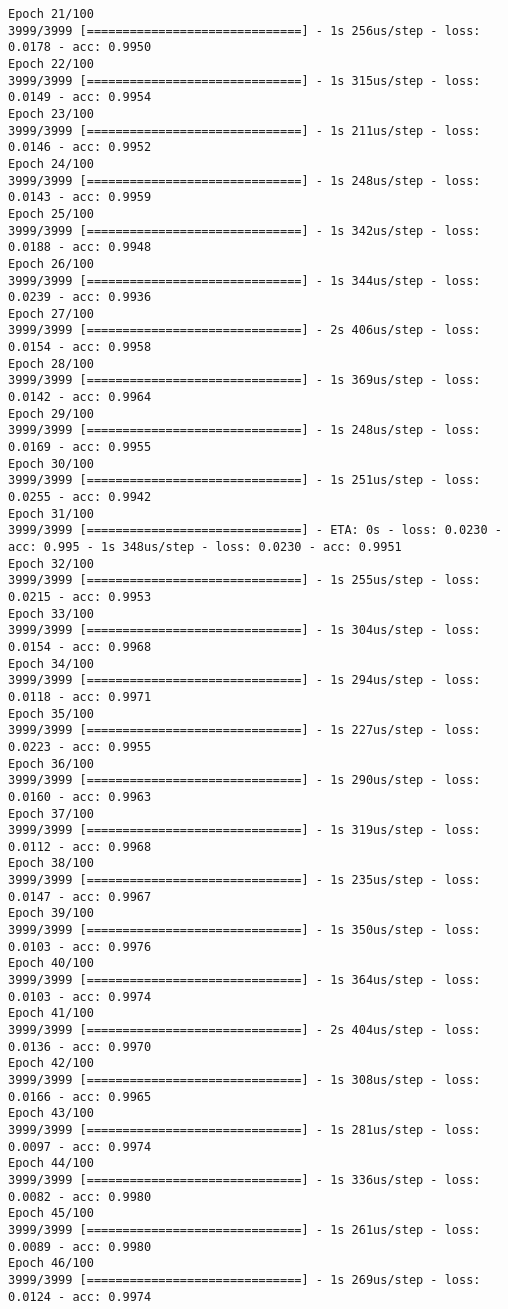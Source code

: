 \documentclass[11pt]{article}
\begin{document}
\begin{Verbatim}[commandchars=\\\{\}]
Epoch 21/100
3999/3999 [==============================] - 1s 256us/step - loss: 0.0178 - acc: 0.9950
Epoch 22/100
3999/3999 [==============================] - 1s 315us/step - loss: 0.0149 - acc: 0.9954
Epoch 23/100
3999/3999 [==============================] - 1s 211us/step - loss: 0.0146 - acc: 0.9952
Epoch 24/100
3999/3999 [==============================] - 1s 248us/step - loss: 0.0143 - acc: 0.9959
Epoch 25/100
3999/3999 [==============================] - 1s 342us/step - loss: 0.0188 - acc: 0.9948
Epoch 26/100
3999/3999 [==============================] - 1s 344us/step - loss: 0.0239 - acc: 0.9936
Epoch 27/100
3999/3999 [==============================] - 2s 406us/step - loss: 0.0154 - acc: 0.9958
Epoch 28/100
3999/3999 [==============================] - 1s 369us/step - loss: 0.0142 - acc: 0.9964
Epoch 29/100
3999/3999 [==============================] - 1s 248us/step - loss: 0.0169 - acc: 0.9955
Epoch 30/100
3999/3999 [==============================] - 1s 251us/step - loss: 0.0255 - acc: 0.9942
Epoch 31/100
3999/3999 [==============================] - ETA: 0s - loss: 0.0230 - acc: 0.995 - 1s 348us/step - loss: 0.0230 - acc: 0.9951
Epoch 32/100
3999/3999 [==============================] - 1s 255us/step - loss: 0.0215 - acc: 0.9953
Epoch 33/100
3999/3999 [==============================] - 1s 304us/step - loss: 0.0154 - acc: 0.9968
Epoch 34/100
3999/3999 [==============================] - 1s 294us/step - loss: 0.0118 - acc: 0.9971
Epoch 35/100
3999/3999 [==============================] - 1s 227us/step - loss: 0.0223 - acc: 0.9955
Epoch 36/100
3999/3999 [==============================] - 1s 290us/step - loss: 0.0160 - acc: 0.9963
Epoch 37/100
3999/3999 [==============================] - 1s 319us/step - loss: 0.0112 - acc: 0.9968
Epoch 38/100
3999/3999 [==============================] - 1s 235us/step - loss: 0.0147 - acc: 0.9967
Epoch 39/100
3999/3999 [==============================] - 1s 350us/step - loss: 0.0103 - acc: 0.9976
Epoch 40/100
3999/3999 [==============================] - 1s 364us/step - loss: 0.0103 - acc: 0.9974
Epoch 41/100
3999/3999 [==============================] - 2s 404us/step - loss: 0.0136 - acc: 0.9970
Epoch 42/100
3999/3999 [==============================] - 1s 308us/step - loss: 0.0166 - acc: 0.9965
Epoch 43/100
3999/3999 [==============================] - 1s 281us/step - loss: 0.0097 - acc: 0.9974
Epoch 44/100
3999/3999 [==============================] - 1s 336us/step - loss: 0.0082 - acc: 0.9980
Epoch 45/100
3999/3999 [==============================] - 1s 261us/step - loss: 0.0089 - acc: 0.9980
Epoch 46/100
3999/3999 [==============================] - 1s 269us/step - loss: 0.0124 - acc: 0.9974

\end{Verbatim}
\end{document}
